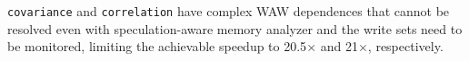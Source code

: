 \texttt{covariance} and \texttt{correlation} have complex WAW dependences
that cannot be resolved even with speculation-aware memory analyzer and
the write sets need to be monitored, limiting the achievable speedup to
20.5$\times$ and 21$\times$, respectively.








